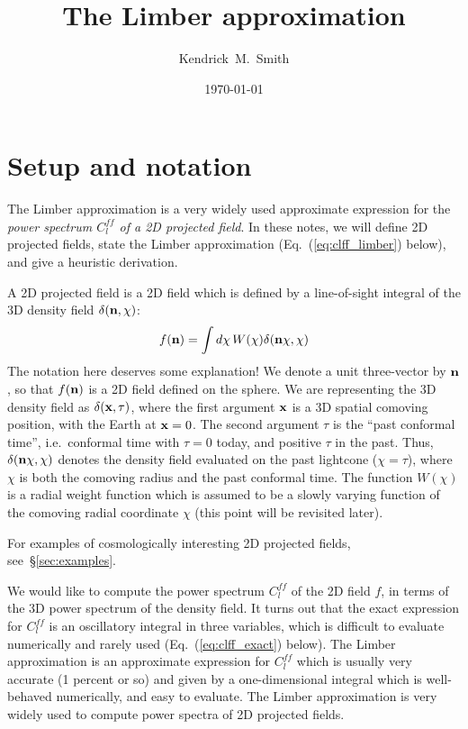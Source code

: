 \documentclass[aps,prd,superscriptaddress,groupedaddress,nofootinbib,nobibnotes]{revtex4}
\newcommand{\be}{\begin{equation}}
\newcommand{\ee}{\end{equation}}
\def\n{{\bf n}}
\def\x{{\bf x}}
\begin{document}
\title{The Limber approximation}

\author{Kendrick~M.~Smith}

\date{\today}


\maketitle

\section{Setup and notation}

The Limber approximation is a very widely used approximate expression for the
{\em power spectrum $C_l^{ff}$ of a 2D projected field}.  In these notes, we will define 
2D projected fields, state the Limber approximation (Eq.~(\ref{eq:clff_limber}) below),
and give a heuristic derivation.

A 2D projected field is a 2D field which is defined by a line-of-sight
integral of the 3D density field $\delta(\n,\chi)$:
\be
f(\n) = \int d\chi \, W(\chi) \delta(\n\chi, \chi)  \label{eq:los_lightcone}
\ee
The notation here deserves some explanation!
We denote a unit three-vector by $\n$, so that $f(\n)$ is a 2D field defined on the sphere.
We are representing the 3D density field as $\delta(\x, \tau)$, where the first argument $\x$
is a 3D spatial comoving position, with the Earth at $\x=0$.  The second argument $\tau$ is the
``past conformal time'', i.e.~conformal time with $\tau=0$ today, and positive $\tau$ in the past.
Thus, $\delta(\n\chi, \chi)$ denotes the density field evaluated on the past lightcone ($\chi=\tau$), 
where $\chi$ is both the comoving radius and the past conformal time.
The function $W(\chi)$ is a radial weight function which is assumed to be a slowly varying 
function of the comoving radial coordinate $\chi$ (this point will be revisited later).

For examples of cosmologically interesting 2D projected fields, see~\S\ref{sec:examples}.

We would like to compute the power spectrum $C_l^{ff}$ of the 2D field $f$,
in terms of the 3D power spectrum of the density field.  
It turns out that the exact expression for $C_l^{ff}$
is an oscillatory integral in three variables, which is difficult to evaluate numerically and rarely used
(Eq.~(\ref{eq:clff_exact}) below).
The Limber approximation is an approximate expression for $C_l^{ff}$ which is usually very accurate
(1 percent or so) and given by a one-dimensional integral which is well-behaved numerically, and easy
to evaluate.  The Limber approximation is very widely used to compute power spectra of 2D projected fields.
\end{document}
